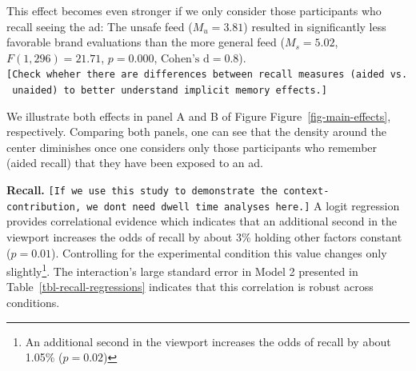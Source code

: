 \documentclass[
  a4paper,
]{scrreprt}
\begin{document}
This effect becomes even stronger if we only consider those participants
who recall seeing the ad: The unsafe feed (\(M_u = 3.81\)) resulted in
significantly less favorable brand evaluations than the more general
feed (\(M_s = 5.02\), \(F(1, 296) = 21.71\), \(p = 0.000\),
\(\text{Cohen's d} = 0.8\)).
\texttt{{[}Check\ wheher\ there\ are\ differences\ between\ recall\ measures\ (aided\ vs.\ unaided)\ to\ better\ understand\ implicit\ memory\ effects.{]}}

We illustrate both effects in panel A and B of Figure
Figure~\ref{fig-main-effects}, respectively. Comparing both panels, one
can see that the density around the center diminishes once one considers
only those participants who remember (aided recall) that they have been
exposed to an ad.

\textbf{Recall.}
\texttt{{[}If\ we\ use\ this\ study\ to\ demonstrate\ the\ context-contribution,\ we\ don\textquotesingle{}t\ need\ dwell\ time\ analyses\ here.{]}}
A logit regression provides correlational evidence which indicates that
an additional second in the viewport increases the odds of recall by
about 3\% holding other factors constant (\(p = 0.01\)). Controlling for
the experimental condition this value changes only slightly\footnote{An
  additional second in the viewport increases the odds of recall by
  about 1.05\% (\(p = 0.02\))}. The interaction's large standard error
in Model 2 presented in Table~\ref{tbl-recall-regressions} indicates
that this correlation is robust across conditions.
\end{document}
